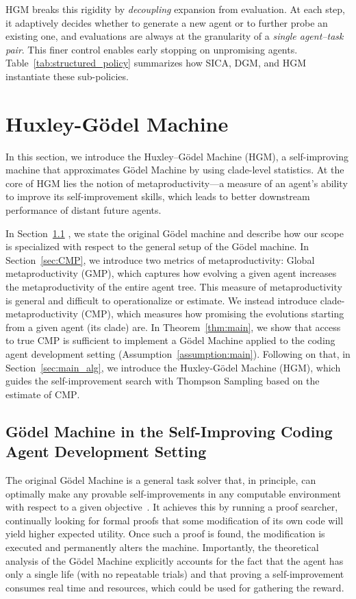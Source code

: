 \documentclass{article}
\begin{document}
HGM breaks this rigidity by \emph{decoupling} expansion from evaluation. At each step, it adaptively decides whether to generate a new agent or to further probe an existing one, and evaluations are always at the granularity of a \emph{single agent–task pair}. This finer control enables early stopping on unpromising agents.
Table~\ref{tab:structured_policy} summarizes how SICA, DGM, and HGM instantiate these sub-policies. 







\section{Huxley-G\"odel Machine}\label{sec:method}
In this section, we introduce the Huxley–G\"odel Machine (HGM), 
a self-improving machine that approximates G\"odel Machine by using clade-level statistics. At the core of HGM lies the notion of metaproductivity—a measure of an agent's ability to improve its self-improvement skills, which leads to better downstream performance of distant future agents.

In Section~\ref{sec:GM_SICAD} , we state the original G\"odel machine and describe how our scope is specialized with respect to the general setup of the G\"odel machine. In Section~\ref{sec:CMP}, we introduce two metrics of metaproductivity: Global metaproductivity ($\mathrm{GMP}$), which captures how evolving a given agent increases the metaproductivity of the entire agent tree. This measure of metaproductivity is general and difficult to operationalize or estimate. We instead introduce clade-metaproductivity ($\mathrm{CMP}$), which measures how promising the evolutions starting from a given agent (its clade) are. In Theorem~\ref{thm:main}, we show that access to true $\mathrm{CMP}$ is sufficient to implement a G\"odel Machine applied to the coding agent development setting (Assumption~\ref{assumption:main}).
Following on that, in Section~\ref {sec:main_alg}, we introduce the Huxley-G\"odel Machine (HGM), which guides the self-improvement search with Thompson Sampling based on the estimate of $\mathrm{CMP}$. 

\subsection{G\"odel Machine in the Self-Improving Coding Agent Development Setting}\label{sec:GM_SICAD}
The original G\"odel Machine is a general task solver that, in principle, can optimally make any provable self-improvements in any computable environment with respect to a given objective~\citep{Schmidhuber:03gm}. It achieves this by running a proof searcher, continually looking for formal proofs that some modification of its own code will yield higher expected utility. Once such a proof is found, the modification is executed and permanently alters the machine. Importantly, the theoretical analysis of the G\"odel Machine explicitly accounts for the fact that the agent has only a single life (with no repeatable trials) and that proving a self-improvement consumes real time and resources, which could be used for gathering the reward.
\end{document}

